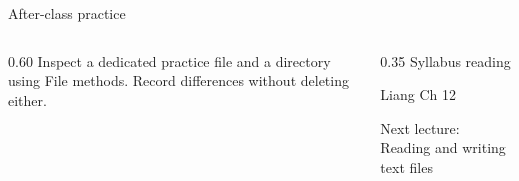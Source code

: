 \documentclass[10pt,aspectratio=169]{beamer}
\begin{document}
\begin{frame}[fragile,t]{After-class practice}
\begin{columns}[T,onlytextwidth]\begin{column}{0.60\textwidth}
Inspect a dedicated practice file and a directory using File methods. Record differences without deleting either.
\end{column}\begin{column}{0.35\textwidth}\small
Syllabus reading\par Liang Ch 12

Next lecture: Reading and writing text files
\end{column}\end{columns}
\end{frame}
\end{document}
